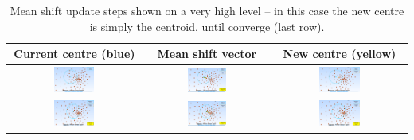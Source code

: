 \documentclass[a4paper]{article}
\begin{document}
\begin{longtable}{ccc}
\caption{Mean shift update steps shown on a very high level -- in this case the new centre is simply the centroid, until converge (last row).} \label{tab:mean_shift_steps}
\endfirsthead %
\endhead %
\toprule
Current centre (blue) & Mean shift vector & New centre (yellow)\\
\midrule
  \includegraphics[width=0.32\textwidth] {img/mean_shift/ROI_densest_01.PNG} &
  \includegraphics[width=0.32\textwidth] {img/mean_shift/ROI_densest_03.PNG} &
  \includegraphics[width=0.32\textwidth] {img/mean_shift/ROI_densest_02.PNG} \\
  \includegraphics[width=0.32\textwidth] {img/mean_shift/ROI_densest_05.PNG} &
  \includegraphics[width=0.32\textwidth] {img/mean_shift/ROI_densest_07.PNG} &   \includegraphics[width=0.32\textwidth] {img/mean_shift/ROI_densest_08.PNG} \\

\end{longtable}
\end{document}
